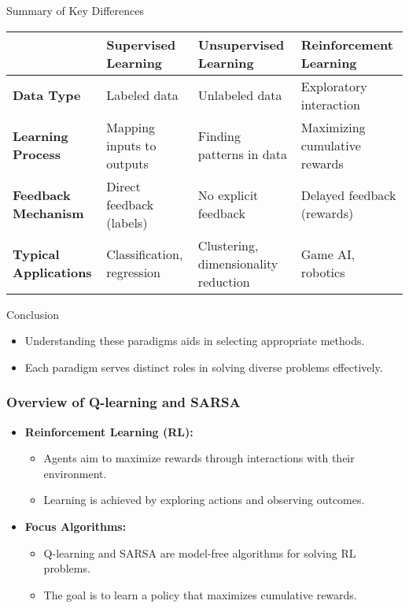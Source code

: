 \documentclass[aspectratio=169]{beamer}
\begin{document}
\begin{frame}[fragile]{Summary of Key Differences}
    \begin{tabular}{|l|l|l|l|}
        \hline
        & \textbf{Supervised Learning} & \textbf{Unsupervised Learning} & \textbf{Reinforcement Learning} \\
        \hline
        \textbf{Data Type} & Labeled data & Unlabeled data & Exploratory interaction \\
        \hline
        \textbf{Learning Process} & Mapping inputs to outputs & Finding patterns in data & Maximizing cumulative rewards \\
        \hline
        \textbf{Feedback Mechanism} & Direct feedback (labels) & No explicit feedback & Delayed feedback (rewards) \\
        \hline
        \textbf{Typical Applications} & Classification, regression & Clustering, dimensionality reduction & Game AI, robotics \\
        \hline
    \end{tabular}
\end{frame}

\begin{frame}[fragile]{Conclusion}
    \begin{itemize}
        \item Understanding these paradigms aids in selecting appropriate methods.
        \item Each paradigm serves distinct roles in solving diverse problems effectively.
    \end{itemize}
\end{frame}

\begin{frame}[fragile]
    \frametitle{Overview of Q-learning and SARSA}
    \begin{itemize}
        \item \textbf{Reinforcement Learning (RL):}
        \begin{itemize}
            \item Agents aim to maximize rewards through interactions with their environment.
            \item Learning is achieved by exploring actions and observing outcomes.
        \end{itemize}
        \item \textbf{Focus Algorithms:}
        \begin{itemize}
            \item Q-learning and SARSA are model-free algorithms for solving RL problems.
            \item The goal is to learn a policy that maximizes cumulative rewards.
        \end{itemize}
    \end{itemize}
\end{frame}
\end{document}
